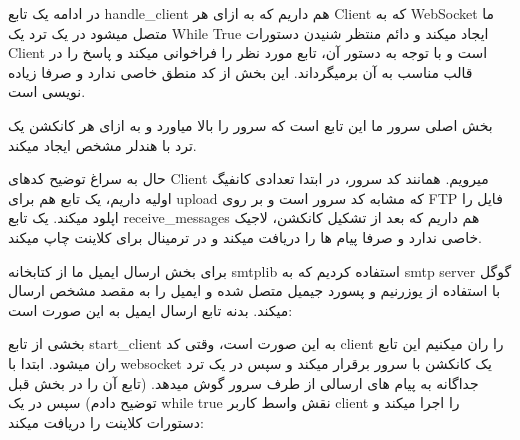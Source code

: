 در ادامه یک تابع handle\_client هم داریم که به ازای هر Client که به WebSocket ما متصل میشود در یک ترد یک While True ایجاد میکند و دائم منتظر شنیدن دستورات Client است و با توجه به دستور آن، تابع مورد نظر را فراخوانی میکند و پاسخ را در قالب مناسب به آن برمیگرداند. این بخش از کد منطق خاصی ندارد و صرفا زیاده نویسی است. 

بخش اصلی سرور ما این تابع است که سرور را بالا میاورد و به ازای هر کانکشن یک ترد با هندلر مشخص ایجاد میکند.


{
}


حال به سراغ توضیح کدهای Client میرویم. همانند کد سرور، در ابتدا تعدادی کانفیگ اولیه داریم، یک تابع هم برای upload که مشابه کد سرور است و بر روی FTP فایل را اپلود میکند. یک تابع receive\_messages هم داریم که بعد از تشکیل کانکشن، لاجیک خاصی ندارد و صرفا پیام ها را دریافت میکند و در ترمینال برای کلاینت چاپ میکند. 


برای بخش ارسال ایمیل ما از کتابخانه smtplib استفاده کردیم که به smtp server گوگل با استفاده از یوزرنیم و پسورد جیمیل متصل شده و ایمیل را به مقصد مشخص ارسال میکند. بدنه تابع ارسال ایمیل به این صورت است:

{
}


بخشی از تابع start\_client به این صورت است، وقتی کد client را ران میکنیم این تابع ران میشود. ابتدا با websocket یک کانکشن با سرور برقرار میکند و سپس در یک ترد جداگانه به پیام های ارسالی از طرف سرور گوش میدهد. (تابع آن را در بخش قبل توضیح دادم) سپس در یک while true نقش واسط کاربر client را اجرا میکند و دستورات کلاینت را دریافت میکند:


